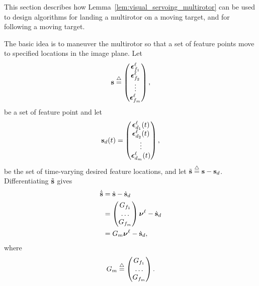 This section describes how Lemma~\ref{lem:visual_servoing_multirotor} can be used to design algorithms for landing a multirotor on a moving target, and for following a moving target.

The basic idea is to maneuver the multirotor so that a set of feature points move to specified locations in the image plane.  Let 
\begin{equation}\label{eq:visual_servoing_sbf}
\sbf \defeq \begin{pmatrix}
\epsilonbf_{f_1}^\ell \\
\epsilonbf_{f_2}^\ell \\
\vdots \\
\epsilonbf_{f_m}^\ell
\end{pmatrix},
\end{equation}
be a set of feature point and let 
\begin{equation}\label{eq:visual_servoing_sbf_d}
\sbf_d(t) = \begin{pmatrix}
\epsilonbf_{d_1}^{\ell}(t) \\
\epsilonbf_{d_2}^{\ell}(t) \\
\vdots \\
\epsilonbf_{d_m}^{\ell}(t)
\end{pmatrix},
\end{equation}
be the set of time-varying desired feature locations, and let $\tilde{\mathbf{s}} \stackrel{\triangle}{=} \mathbf{s} - \mathbf{s}_d$.  Differentiating $\tilde{\mathbf{s}}$ gives
\begin{align*}
\dot{\tilde{\mathbf{s}}} &= \dot{\mathbf{s}} - \dot{\mathbf{s}}_d \\
		   &= \begin{pmatrix} G_{f_1} \\ \dots \\ G_{f_m} \end{pmatrix} \boldsymbol{\nu}^\ell - \dot{\mathbf{s}}_d \\
		   &= G_m \boldsymbol{\nu}^\ell - \dot{\mathbf{s}}_d,
\end{align*}
where 
\[
G_m \stackrel{\triangle}{=} \begin{pmatrix} G_{f_1} \\ \dots \\ G_{f_m} \end{pmatrix}.
\]

